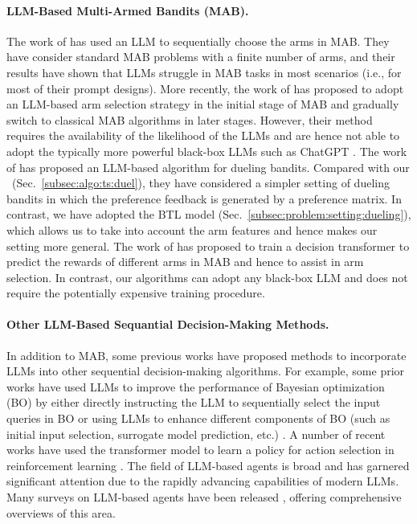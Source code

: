 \paragraph{LLM-Based Multi-Armed Bandits (MAB).}
The work of \citet{krishnamurthy2024can} has used an LLM to sequentially choose the arms in MAB. They have consider standard MAB problems with a finite number of arms, and their results have shown that LLMs struggle in MAB tasks in most scenarios (i.e., for most of their prompt designs).
More recently, the work of \cite{chen2024efficient} has proposed to adopt an LLM-based arm selection strategy in the initial stage of MAB and gradually switch to classical MAB algorithms in later stages. However, their method requires the availability of the likelihood of the LLMs and are hence not able to adopt the typically more powerful black-box LLMs such as ChatGPT \cite{citechatgpt,openai2023gpt4}.
The work of \citet{xia2024beyond} has proposed an LLM-based algorithm for dueling bandits. Compared with our \algtsduel~(Sec.~\ref{subsec:algo:ts:duel}), they have considered a simpler setting of dueling bandits in which the preference feedback is generated by a preference matrix. In contrast, we have adopted the BTL model (Sec.~\ref{subsec:problem:setting:dueling}), which allows us to take into account the arm features and hence makes our setting more general.
The work of \citet{mukherjee2024pretraining} has proposed to train a decision transformer to predict the rewards of different arms in MAB and hence to assist in arm selection.
In contrast, our algorithms can adopt any black-box LLM and does not require the potentially expensive training procedure.

\paragraph{Other LLM-Based Sequantial Decision-Making Methods.}
In addition to MAB, some previous works have proposed methods to incorporate LLMs into other sequential decision-making algorithms.
For example, some prior works have used LLMs to improve the performance of Bayesian optimization (BO) by either directly instructing the LLM to sequentially select the input queries in BO \cite{yang2023large} or using LLMs to enhance different components of BO (such as initial input selection, surrogate model prediction, etc.) \cite{liu2024large}.
A number of recent works have used the transformer model to learn a policy for action selection in reinforcement learning \cite{dai2024context,laskin2022context,lee2024supervised}.
The field of LLM-based agents is broad and has garnered significant attention due to the rapidly advancing capabilities of modern LLMs.
Many surveys on LLM-based agents have been released \cite{cheng2024exploring,wang2024survey,xi2023rise}, offering comprehensive overviews of this area.
